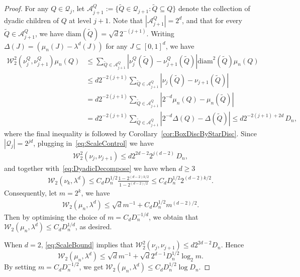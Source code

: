 \documentclass[11pt]{article}
\begin{document}
\begin{proof}
For any $Q \in \mathcal{Q}_j$, let $\mathcal{A}^Q_{j+1} := \{\widetilde{Q} \in \mathcal{Q}_{j+1}:\widetilde{Q}\subseteq Q\}$ denote the collection of dyadic children of $Q$ at level $j+1$. Note that $|\mathcal{A}_{j+1}^Q| = 2^d$, and that for every $\widetilde{Q} \in \mathcal{A}_{j+1}^Q$, we have $\mathrm{diam}(\widetilde{Q})= \sqrt{d}2^{-(j+1)}$. Writing $\Delta(J) = (\mu_n (J) - \lambda^d(J))$ for any $J \subseteq [0, 1]^d$, we have
\begin{align*}
    \mathcal{W}_2^2(\nu_j^{Q}, \nu_{j+1}^{Q}) \mu_n (Q) &\leq \sum_{\widetilde{Q} \in \mathcal{A}_{j+1}^Q} |\nu_j^{Q}(\widetilde{Q}) - \nu_{j+1}^{Q}(\widetilde{Q})| \mathrm{diam}^2(\widetilde{Q}) \mu_n (Q) \\ 
    &\leq d 2^{-2(j+1)} \sum_{\widetilde{Q} \in \mathcal{A}_{j+1}^Q} |\nu_j(\widetilde{Q}) - \nu_{j+1}(\widetilde{Q})|   \\
    &=d 2^{-2(j+1)} \sum_{\widetilde{Q} \in \mathcal{A}_{j+1}^Q} |2^{-d}\mu_n(Q) - \mu_n(\widetilde{Q})| \\
    & = d 2^{-2(j+1)} \sum_{\widetilde{Q} \in \mathcal{A}_{j+1}^Q} |2^{-d}\Delta(Q) - \Delta(\widetilde{Q})| \leq  d 2^{-2(j+1)+2d}\, D_n,
\end{align*}
where the final inequality is followed by Corollary~\ref{cor:BoxDiscByStarDisc}. Since $|\mathcal{Q}_j| = 2^{jd}$, plugging in~\eqref{eq:ScaleControl} we have 
\begin{align}
\mathcal{W}_2^2(\nu_j, \nu_{j+1}) \leq  d 2^{2d-2} 2^{j(d-2)}\, D_n,  \label{eq:ScaleBound}
\end{align}
and together with~\eqref{eq:DyadicDecompose} we have when $d \geq 3$
\begin{align*}
    \mathcal{W}_2(\nu_k, \lambda^d) \leq C_d D_n^{1/2} \frac{1 - 2^{(d-2)k/2}}{1 - 2^{(d-2)/2}}  \leq C_d  D_n^{1/2} 2^{(d-2)k/2}.
\end{align*}
Consequently, let $m = 2^k$, we have 
\begin{align*}
    \mathcal{W}_2(\mu_n, \lambda^d) \leq \sqrt{d}m^{-1} + C_d  D_n^{1/2} m^{(d-2)/2}.
\end{align*}
Then by optimising the choice of $m = C_d D_n^{-1/d}$, we obtain that $\mathcal{W}_2(\mu_n,\lambda^d) \leq C_d D_n^{1/d}$, as desired. 

When $d = 2$, \eqref{eq:ScaleBound} implies that $\mathcal{W}_2^2(\nu_j, \nu_{j+1}) \leq d 2^{2d-2} D_n$. Hence 
\[
\mathcal{W}_2(\mu_n, \lambda^d) \leq \sqrt{d}m^{-1} + \sqrt{d} 2^{d-1} D_n^{1/2}  \log_2 m.
\]
By setting $m =C_d D_n^{-1/2}$, we get $\mathcal{W}_2(\mu_n,\lambda^d) \leq C_d D_n^{1/2} \log D_n.$


\end{proof}
\end{document}
